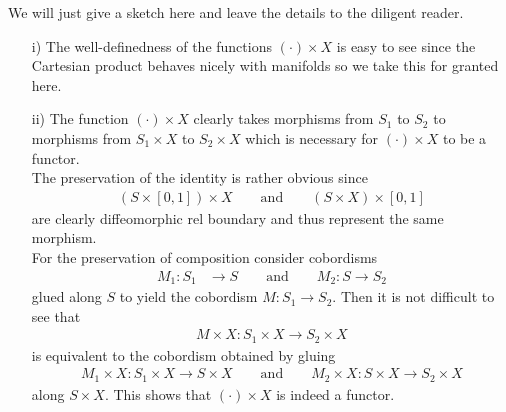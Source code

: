 \begin{prf}[Sketch]
We will just give a sketch here and leave the details to the diligent reader.
\begin{enumerate}
\item[i)]
The well-definedness of the functions $(\cdot) \times X$ is easy to see since the Cartesian product behaves nicely with manifolds so we take this for granted here.

\item[ii)]
The function $(\cdot) \times X$ clearly takes morphisms from $S_{1}$ to $S_{2}$ to morphisms from $S_{1} \times X$ to $S_{2} \times X$ which is necessary for $(\cdot) \times X$ to be a functor.
\\
The preservation of the identity is rather obvious since
\begin{align*}
  \left(
    S
    \times
    [0,1]
  \right)
  \times
  X
  \qquad
  \text{and}
  \qquad
  \left(
    S
    \times
    X
  \right)
  \times
  [0,1]
\end{align*}
are clearly diffeomorphic rel boundary and thus represent the same morphism.
\\
For the preservation of composition consider cobordisms
\begin{align*}
  M_{1}
  \colon
  S_{1}
  &\to
  S
  \qquad
  \text{and}
  \qquad
  M_{2}
  \colon
  S
  \to
  S_{2}
\end{align*}
glued along $S$ to yield the cobordism $M \colon S_{1} \to S_{2}$. Then it is not difficult to see that
\begin{align*}
M \times X \colon S_{1} \times X \to S_{2} \times X
\end{align*}
is equivalent to the cobordism obtained by gluing
\begin{align*}
  M_{1} \times X \colon S_{1} \times X \to S \times X
  \qquad
  \text{and}
  \qquad
  M_{2}
  \times
  X
  \colon
  S
  \times
  X
  \to
  S_{2}
  \times
  X
\end{align*}
along $S \times X$. This shows that $(\cdot) \times X$ is indeed a functor.


\end{enumerate}
\end{prf}
